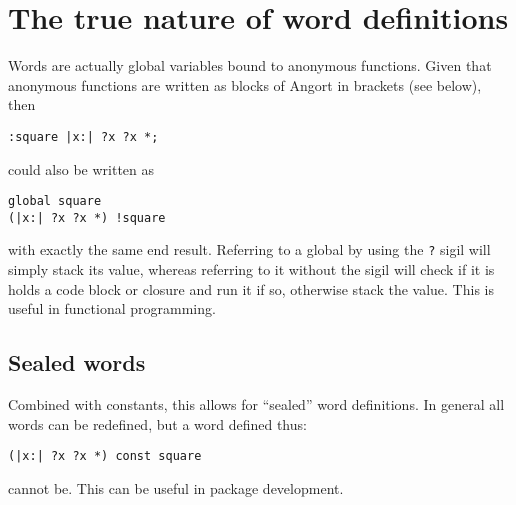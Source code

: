 \section{The true nature of word definitions}
\label{globdetails}
Words are actually global variables bound to anonymous functions.
Given that anonymous functions are written as blocks of Angort
in brackets (see below), then
\begin{lstlisting}
:square |x:| ?x ?x *;
\end{lstlisting}
could also be written as
\begin{lstlisting}
global square
(|x:| ?x ?x *) !square
\end{lstlisting}
with exactly the same end result. Referring to a global by using the \texttt{?} sigil
will simply stack its value, whereas referring to it without the sigil
will check if it is holds a code block or closure and run it if so, otherwise
stack the value. This is useful in functional programming.

\subsection{Sealed words}
Combined with constants, this allows for ``sealed'' word definitions. 
In general all words can be redefined, but a word defined thus:
\begin{lstlisting}
(|x:| ?x ?x *) const square
\end{lstlisting}
cannot be. This can be useful in package development.

